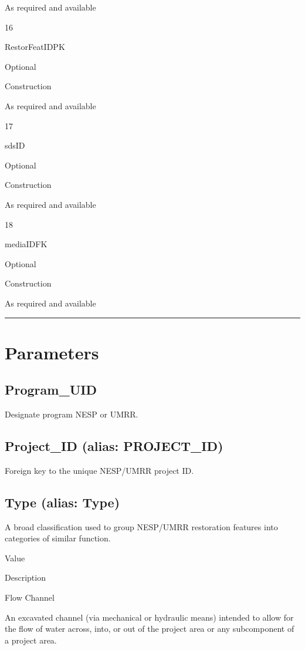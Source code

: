 \documentclass[
  letterpaper,
  DIV=11,
  numbers=noendperiod]{scrreprt}
\begin{document}
As required and available

16

RestorFeatIDPK

Optional

Construction

As required and available

17

sdsID

Optional

Construction

As required and available

18

mediaIDFK

Optional

Construction

As required and available

\begin{center}\rule{0.5\linewidth}{0.5pt}\end{center}

\section{Parameters}\label{parameters-5}

\subsection{Program\_UID}\label{program_uid-5}

Designate program NESP or UMRR.

\subsection{Project\_ID (alias:
PROJECT\_ID)}\label{project_id-alias-project_id-5}

Foreign key to the unique NESP/UMRR project ID.

\subsection{Type (alias: Type)}\label{type-alias-type}

A broad classification used to group NESP/UMRR restoration features into
categories of similar function.

Value

Description

Flow Channel

An excavated channel (via mechanical or hydraulic means) intended to
allow for the flow of water across, into, or out of the project area or
any subcomponent of a project area.
\end{document}
